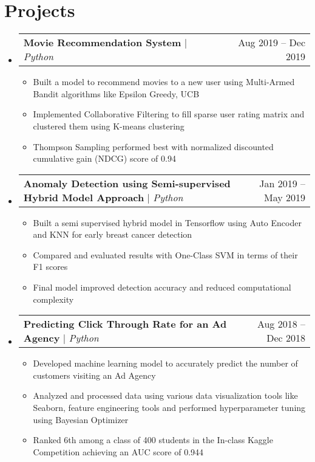 \documentclass[letterpaper,11pt]{article}
\makeatletter
\newcommand{\resumeItem}[1]{
  \item\small{
    {#1 \vspace{-2pt}}
  }
}
\newcommand{\resumeProjectHeading}[2]{
    \item
    \begin{tabular*}{0.97\textwidth}{l@{\extracolsep{\fill}}r}
      \small#1 & #2 \\
    \end{tabular*}\vspace{-7pt}
}
\newcommand{\resumeSubHeadingListStart}{\begin{itemize}[leftmargin=0.15in, label={}]}
\newcommand{\resumeSubHeadingListEnd}{\end{itemize}}
\newcommand{\resumeItemListStart}{\begin{itemize}}
\newcommand{\resumeItemListEnd}{\end{itemize}\vspace{-5pt}}
\makeatother
\begin{document}
\section{Projects}
    \resumeSubHeadingListStart
      \resumeProjectHeading
          {\textbf{Movie Recommendation System} $|$ \emph{Python}}{Aug 2019 -- Dec 2019}
          \resumeItemListStart
            \resumeItem{Built a model to recommend movies to a new user using Multi-Armed Bandit algorithms like Epsilon Greedy, UCB}
            \resumeItem{Implemented Collaborative Filtering to fill sparse user rating matrix and clustered them using K-means clustering}
            \resumeItem{Thompson Sampling performed best with normalized discounted cumulative gain (NDCG) score of 0.94}
          \resumeItemListEnd
      \resumeProjectHeading
          {\textbf{Anomaly Detection using Semi-supervised Hybrid Model Approach} $|$ \emph{Python}}{Jan 2019 -- May 2019}
          \resumeItemListStart
            \resumeItem{Built a semi supervised hybrid model in Tensorflow using Auto Encoder and KNN for early breast cancer detection}
            \resumeItem{Compared and evaluated results with One-Class SVM in terms of their F1 scores}
            \resumeItem{Final model improved detection accuracy and reduced computational complexity}
          \resumeItemListEnd
      \resumeProjectHeading
          {\textbf{Predicting Click Through Rate for an Ad Agency} $|$ \emph{Python}}{Aug 2018 -- Dec 2018}
          \resumeItemListStart
            \resumeItem{Developed machine learning model to accurately predict the number of customers visiting an Ad Agency}
            \resumeItem{Analyzed and processed data using various data visualization tools like Seaborn, feature engineering tools
and performed hyperparameter tuning using Bayesian Optimizer}
            \resumeItem{Ranked 6th among a class of 400 students in the In-class Kaggle Competition achieving an AUC score of 0.944}
          \resumeItemListEnd
    \resumeSubHeadingListEnd



%
\end{document}
